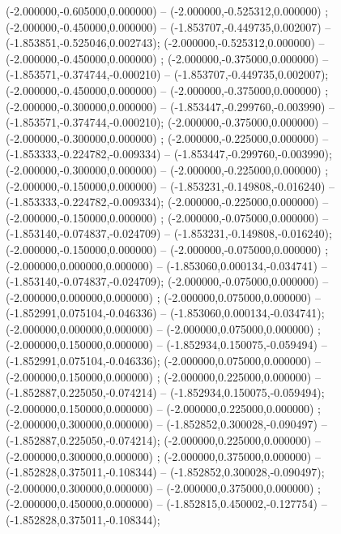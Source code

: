  (-2.000000,-0.605000,0.000000) -- (-2.000000,-0.525312,0.000000) ;
 (-2.000000,-0.450000,0.000000) -- (-1.853707,-0.449735,0.002007) -- (-1.853851,-0.525046,0.002743);
 (-2.000000,-0.525312,0.000000) -- (-2.000000,-0.450000,0.000000) ;
 (-2.000000,-0.375000,0.000000) -- (-1.853571,-0.374744,-0.000210) -- (-1.853707,-0.449735,0.002007);
 (-2.000000,-0.450000,0.000000) -- (-2.000000,-0.375000,0.000000) ;
 (-2.000000,-0.300000,0.000000) -- (-1.853447,-0.299760,-0.003990) -- (-1.853571,-0.374744,-0.000210);
 (-2.000000,-0.375000,0.000000) -- (-2.000000,-0.300000,0.000000) ;
 (-2.000000,-0.225000,0.000000) -- (-1.853333,-0.224782,-0.009334) -- (-1.853447,-0.299760,-0.003990);
 (-2.000000,-0.300000,0.000000) -- (-2.000000,-0.225000,0.000000) ;
 (-2.000000,-0.150000,0.000000) -- (-1.853231,-0.149808,-0.016240) -- (-1.853333,-0.224782,-0.009334);
 (-2.000000,-0.225000,0.000000) -- (-2.000000,-0.150000,0.000000) ;
 (-2.000000,-0.075000,0.000000) -- (-1.853140,-0.074837,-0.024709) -- (-1.853231,-0.149808,-0.016240);
 (-2.000000,-0.150000,0.000000) -- (-2.000000,-0.075000,0.000000) ;
 (-2.000000,0.000000,0.000000) -- (-1.853060,0.000134,-0.034741) -- (-1.853140,-0.074837,-0.024709);
 (-2.000000,-0.075000,0.000000) -- (-2.000000,0.000000,0.000000) ;
 (-2.000000,0.075000,0.000000) -- (-1.852991,0.075104,-0.046336) -- (-1.853060,0.000134,-0.034741);
 (-2.000000,0.000000,0.000000) -- (-2.000000,0.075000,0.000000) ;
 (-2.000000,0.150000,0.000000) -- (-1.852934,0.150075,-0.059494) -- (-1.852991,0.075104,-0.046336);
 (-2.000000,0.075000,0.000000) -- (-2.000000,0.150000,0.000000) ;
 (-2.000000,0.225000,0.000000) -- (-1.852887,0.225050,-0.074214) -- (-1.852934,0.150075,-0.059494);
 (-2.000000,0.150000,0.000000) -- (-2.000000,0.225000,0.000000) ;
 (-2.000000,0.300000,0.000000) -- (-1.852852,0.300028,-0.090497) -- (-1.852887,0.225050,-0.074214);
 (-2.000000,0.225000,0.000000) -- (-2.000000,0.300000,0.000000) ;
 (-2.000000,0.375000,0.000000) -- (-1.852828,0.375011,-0.108344) -- (-1.852852,0.300028,-0.090497);
 (-2.000000,0.300000,0.000000) -- (-2.000000,0.375000,0.000000) ;
 (-2.000000,0.450000,0.000000) -- (-1.852815,0.450002,-0.127754) -- (-1.852828,0.375011,-0.108344);

